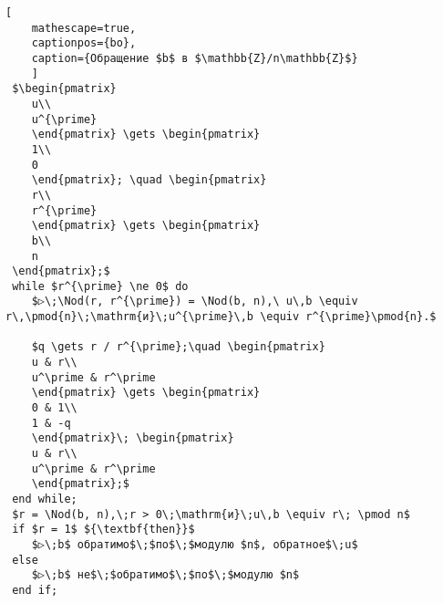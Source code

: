     \setcounter{lstlisting}{0}
    \begin{center}
    \begin{minipage}{0.85\textwidth}
    \begin{lstlisting}[
    mathescape=true,
    captionpos={bo},
    caption={Обращение $b$ в $\mathbb{Z}/n\mathbb{Z}$}
    ]
 $\begin{pmatrix}
    u\\
    u^{\prime}
    \end{pmatrix} \gets \begin{pmatrix}
    1\\
    0
    \end{pmatrix}; \quad \begin{pmatrix}
    r\\
    r^{\prime}
    \end{pmatrix} \gets \begin{pmatrix}
    b\\
    n
 \end{pmatrix};$
 while $r^{\prime} \ne 0$ do
    $▷\;\Nod(r, r^{\prime}) = \Nod(b, n),\ u\,b \equiv r\,\pmod{n}\;\mathrm{и}\;u^{\prime}\,b \equiv r^{\prime}\pmod{n}.$

    $q \gets r / r^{\prime};\quad \begin{pmatrix}
    u & r\\
    u^\prime & r^\prime
    \end{pmatrix} \gets \begin{pmatrix}
    0 & 1\\
    1 & -q
    \end{pmatrix}\; \begin{pmatrix}
    u & r\\
    u^\prime & r^\prime
    \end{pmatrix};$
 end while;
 $r = \Nod(b, n),\;r > 0\;\mathrm{и}\;u\,b \equiv r\; \pmod n$
 if $r = 1$ ${\textbf{then}}$
    $▷\;b$ обратимо$\;$по$\;$модулю $n$, обратное$\;u$
 else
    $▷\;b$ не$\;$обратимо$\;$по$\;$модулю $n$
 end if;
    \end{lstlisting}
    \end{minipage}
    \end{center}

